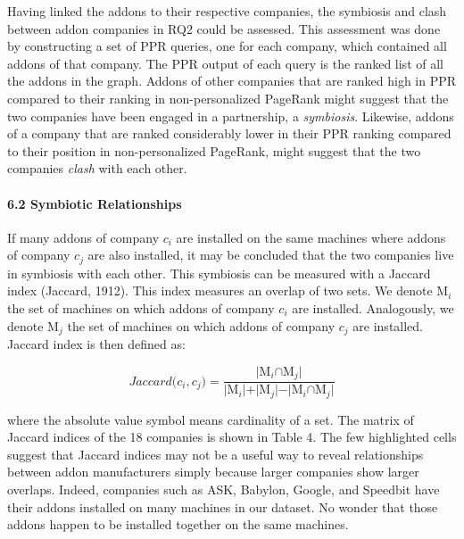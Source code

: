 \documentclass{article} %
\begin{document}
Having linked the addons to their respective companies, the symbiosis and clash between addon companies in RQ2 could be assessed. This assessment was done by constructing a set of PPR queries, one for each company, which contained all addons of that company. The PPR output of each query is the ranked list of all the addons in the graph. Addons of other companies that are ranked high in PPR compared to their ranking in non-personalized PageRank might suggest that the two companies have been engaged in a partnership, a \textit{symbiosis}. Likewise, addons of a company that are ranked considerably lower in their PPR ranking compared to their position in non-personalized PageRank, might suggest that the two companies \textit{clash} with each other. 




\paragraph{6.2  Symbiotic Relationships}

If many addons of company $c_i$ are installed on the same machines where addons of company $c_j$ are also installed, it may be concluded that the two companies live in symbiosis with each other. This symbiosis can be measured with a Jaccard index (Jaccard, 1912). This index measures an overlap of two sets. We denote ${\boldsymbol{\mathrm{M}}}_i$ the set of machines on which addons of company $c_i$ are installed. Analogously, we denote ${\boldsymbol{\mathrm{M}}}_j$ the set of machines on which addons of company $c_j$ are installed. Jaccard index is then defined as: 


\begin{equation} \label{GrindEQ__5_} 
Jaccard\mathrm{(}c_i,c_j\mathrm{)=}\frac{\mathrm{|}{\boldsymbol{\mathrm{M}}}_i\mathrm{\cap }{\boldsymbol{\mathrm{M}}}_j\mathrm{|}}{\mathrm{|}{\boldsymbol{\mathrm{M}}}_i\mathrm{|+|}{\boldsymbol{\mathrm{M}}}_j\mathrm{|-|}{\boldsymbol{\mathrm{M}}}_i\mathrm{\cap }{\boldsymbol{\mathrm{M}}}_j\mathrm{|}} 
\end{equation} 


\noindent where the absolute value symbol means cardinality of a set. The matrix of Jaccard indices of the 18 companies is shown in Table 4. The few highlighted cells suggest that Jaccard indices may not be a useful way to reveal relationships between addon manufacturers simply because larger companies show larger overlaps. Indeed, companies such as ASK, Babylon, Google, and Speedbit have their addons installed on many machines in our dataset. No wonder that those addons happen to be installed together on the same machines.
\end{document}
